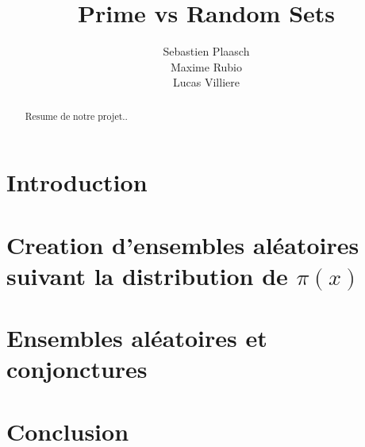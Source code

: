 \documentclass{article}
\begin{document}
\author{Sebastien Plaasch \\ Maxime Rubio  \\ Lucas Villiere}
\title{Prime vs Random Sets}
\maketitle
\newpage 
\begin{abstract}
    Resume de notre projet..
\end{abstract}
\newpage
\tableofcontents


\newpage

\section*{Introduction}
    \label{sec:intro}


\section{Creation d'ensembles aléatoires suivant la distribution de $\pi(x)$}
    \label{sec:sec1}
    
    
    

\section{Ensembles aléatoires et conjonctures}
    
	
		
\section*{Conclusion}

\newpage
\printindex
\end{document}
